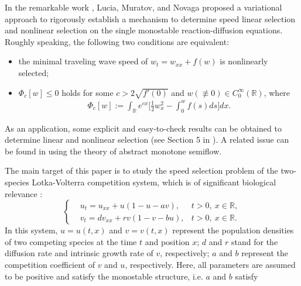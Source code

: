 \documentclass[11pt,a4paper]{article}
\numberwithin{equation}{section}
\numberwithin{figure}{section}
\newcommand\beaa{\begin{eqnarray*}}
\newcommand\eeaa{\end{eqnarray*}}
\begin{document}


In the remarkable work \cite{Lucia Muratov Novaga},
Lucia, Muratov, and Novaga proposed a variational approach to rigorously establish a mechanism to determine speed linear selection and nonlinear selection on the single monostable reaction-diffusion equations. Roughly speaking, the following two conditions are equivalent:
\begin{itemize}
\item[(i)] the minimal traveling wave speed of
$w_t=w_{xx}+f(w)$
is nonlinearly selected;
\item[(ii)] $\Phi_c[w]\leq 0$ holds for some $c>2\sqrt{f'(0)}$ and $w(\not\equiv 0)\in C_0^\infty(\mathbb{R})$, where
\beaa
\Phi_c[w]:=\int_\mathbb{R}e^{cx}\Big[\frac{1}{2}w_x^2-\int_0^wf(s)ds\Big]dx.
\eeaa
\end{itemize}
As an application, some explicit and easy-to-check results can be obtained to determine linear and nonlinear selection (see Section 5 in \cite{Lucia Muratov Novaga}). A related issue can be found in \cite{Ma Ou} using the theory of abstract monotone semiflow.




The main target of this paper is to study the speed selection problem of the two-species Lotka-Volterra competition system, which is of significant biological relevance \cite{Murray1993}:
\begin{equation}\label{system}
\left\{
\begin{aligned}
&u_t=u_{xx}+u(1-u-av), & t>0,\ x\in\mathbb{R},\\
&v_t=dv_{xx}+rv(1-v-bu), & t>0,\ x\in \mathbb{R}.
\end{aligned}
\right.
\end{equation}
In this system, $u=u(t,x)$ and $v=v(t,x)$ represent the population densities of two competing species at the time $t$ and position $x$; $d$ and $r$ stand for the diffusion rate and intrinsic growth rate of $v$, respectively; $a$ and $b$ represent the competition coefficient of $v$ and $u$, respectively. Here, all parameters are assumed to be positive and satisfy the monostable structure, i.e. %
$a$ and $b$ satisfy
\end{document}
